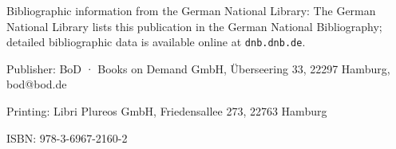 %

\vspace{0.5cm}
{\footnotesize

Bibliographic information from the German National Library: The German
National Library lists this publication in the German National
Bibliography; detailed bibliographic data is available online at
\texttt{dnb.dnb.de}.

\vspace{0.3cm}

Publisher: BoD · Books on Demand GmbH, Überseering 33, 22297 Hamburg,
bod@bod.de

Printing: Libri Plureos GmbH, Friedensallee 273, 22763 Hamburg

\vspace{0.3cm}

ISBN: 978-3-6967-2160-2

}
